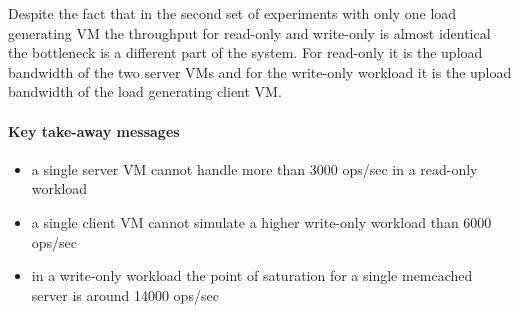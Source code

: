 \documentclass[report.tex]{subfiles}
\begin{document}
Despite the fact that in the second set of experiments with only one load generating VM the throughput for read-only and write-only is almost identical the bottleneck is a different part of the system. For read-only it is the upload bandwidth of the two server VMs and for the write-only workload it is the upload bandwidth of the load generating client VM.

\paragraph{Key take-away messages}
\begin{itemize}
	\vitemsep
	\item a single server VM cannot handle more than 3000 ops/sec in a read-only workload
	\item a single client VM cannot simulate a higher write-only workload than 6000 ops/sec
	\item in a write-only workload the point of saturation for a single memcached server is around 14000 ops/sec
\end{itemize}
\end{document}
